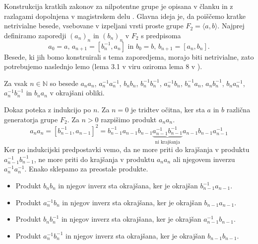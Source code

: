 Konstrukcija kratkih zakonov za nilpotentne grupe je opisana v članku \cite{Elkasapy_Thom_2013} in z razlagami dopolnjena v magistrskem delu \cite{Schneider_2016}.
Glavna ideja je, da poiščemo kratke netrivialne besede, vsebovane v izpeljani vrsti proste grupe $F_2 = \langle a, b \rangle $. Najprej definiramo zaporedji $(a_n)_n$ in $(b_n)_n$ v $F_2$ s predpisoma
\begin{equation*}
a_0 = a, \, a_{n + 1} = [b_n^{-1}, a_{n}] \text{ in } b_0 = b, \, b_{n + 1} = [a_{n}, b_{n}]. 
\end{equation*}  
Besede, ki jih bomo konstruirali s tema zaporedjema, morajo biti netrivialne, zato potrebujemo naslednjo lemo (lema 3.1 v viru \cite{Kozma_Thom_2016} oziroma lema 8 v \cite{Schneider_2016}).
\begin{lema}
\label{lem_ni_krajsanj_produkti_ab}
Za vsak $n \in  \mathbb{N}$ so besede $a_{n} a_{n}$, $a_{n}^{-1} a_{n}^{-1}$, $b_{n} b_{n}$, $b_{n}^{-1} b_{n}^{-1}$, $a_{n}^{-1} b_{n}$, $b_{n}^{-1} a_{n}$, $a_{n} b_{n}^{-1}$, $b_{n} a_{n}^{-1}$, $a_{n}^{-1} b_{n}^{-1}$ in $b_{n} a_{n}$ v okrajšani obliki.   
\end{lema}
\begin{dokaz}
    Dokaz poteka z indukcijo po $n$. Za $n = 0$ je tridtev očitna, ker sta $a$ in $b$ različna generatorja grupe $F_2$. Za $n > 0$ razpišimo produkt $a_n a_n$.
    \begin{equation*}
    a_{n} a_{n} = [b_{n- 1}^{-1}, a_{n-1}]^2 = b_{n- 1}^{-1} a_{n-1} b_{n- 1} \underbrace{a_{n-1}^{-1} b_{n- 1}^{-1}}_{\text{ni krajšanja}}  a_{n-1} b_{n- 1} a_{n-1}^{-1} 
    \end{equation*}  
    Ker po indukcijski predpostavki vemo, da ne more priti do krajšanja v produktu $a_{n -1}^{-1} b_{n -1}^{-1}$, ne more priti do krajšanja v produktu $a_{n} a_{n}$ ali njegovem inverzu $a_{n}^{-1} a_{n}^{-1}$. Enako sklepamo za preostale produkte.
    \begin{itemize}
        \item Produkt $b_{n} b_{n}$ in njegov inverz sta okrajšana, ker je okrajšan $b_{n - 1}^{-1} a_{n-1}.$
        \item Produkt $a_{n}^{-1} b_{n}$ in njegov inverz sta okrajšana, ker je okrajšan $b_{n - 1} a_{n-1}.$
        \item Produkt $b_{n} b_{n}^{-1}$ in njegov inverz sta okrajšana, ker je okrajšan $a_{n - 1}^{-1} b_{n-1}.$
        \item Produkt $a_{n}^{-1} b_{n}^{-1}$ in njegov inverz sta okrajšana, ker je okrajšan $b_{n - 1} b_{n-1}.$
    \end{itemize}     
\end{dokaz}

